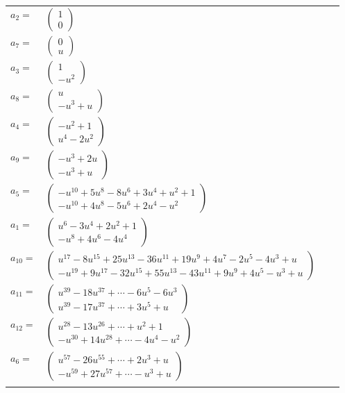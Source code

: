 \documentclass[1p]{elsarticle_modified}
\theoremstyle{definition}
\begin{document}
\begin{tabular}{m{7pt} m{180pt} m{7pt} m{180pt} }
\flushright $a_{2}=$&$\begin{pmatrix}1\\0\end{pmatrix}$ \\
\flushright $a_{7}=$&$\begin{pmatrix}0\\u\end{pmatrix}$ \\
\flushright $a_{3}=$&$\begin{pmatrix}1\\- u^2\end{pmatrix}$ \\
\flushright $a_{8}=$&$\begin{pmatrix}u\\- u^3+u\end{pmatrix}$ \\
\flushright $a_{4}=$&$\begin{pmatrix}- u^2+1\\u^4-2 u^2\end{pmatrix}$ \\
\flushright $a_{9}=$&$\begin{pmatrix}- u^3+2 u\\- u^3+u\end{pmatrix}$ \\
\flushright $a_{5}=$&$\begin{pmatrix}- u^{10}+5 u^8-8 u^6+3 u^4+u^2+1\\- u^{10}+4 u^8-5 u^6+2 u^4- u^2\end{pmatrix}$ \\
\flushright $a_{1}=$&$\begin{pmatrix}u^6-3 u^4+2 u^2+1\\- u^8+4 u^6-4 u^4\end{pmatrix}$ \\
\flushright $a_{10}=$&$\begin{pmatrix}u^{17}-8 u^{15}+25 u^{13}-36 u^{11}+19 u^9+4 u^7-2 u^5-4 u^3+u\\- u^{19}+9 u^{17}-32 u^{15}+55 u^{13}-43 u^{11}+9 u^9+4 u^5- u^3+u\end{pmatrix}$ \\
\flushright $a_{11}=$&$\begin{pmatrix}u^{39}-18 u^{37}+\cdots-6 u^5-6 u^3\\u^{39}-17 u^{37}+\cdots+3 u^5+u\end{pmatrix}$ \\
\flushright $a_{12}=$&$\begin{pmatrix}u^{28}-13 u^{26}+\cdots+u^2+1\\- u^{30}+14 u^{28}+\cdots-4 u^4- u^2\end{pmatrix}$ \\
\flushright $a_{6}=$&$\begin{pmatrix}u^{57}-26 u^{55}+\cdots+2 u^3+u\\- u^{59}+27 u^{57}+\cdots- u^3+u\end{pmatrix}$\\&\end{tabular}
\end{document}
